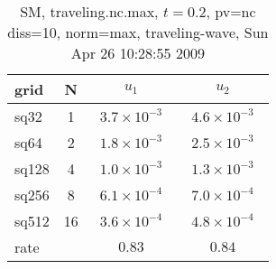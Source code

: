 \begin{table}[hbt]\tableFont %
\begin{center}
\begin{tabular}{|l|c|c|c|} \hline\hline 
grid  & N &  $u_1$ & $u_2$  \\ \hline 
                sq32 &     1 & ~$3.7\times10^{ -3}$~ & ~$4.6\times10^{ -3}$~  \\ \hline
                sq64 &     2 & ~$1.8\times10^{ -3}$~ & ~$2.5\times10^{ -3}$~  \\ \hline
               sq128 &     4 & ~$1.0\times10^{ -3}$~ & ~$1.3\times10^{ -3}$~  \\ \hline
               sq256 &     8 & ~$6.1\times10^{ -4}$~ & ~$7.0\times10^{ -4}$~  \\ \hline
               sq512 &    16 & ~$3.6\times10^{ -4}$~ & ~$4.8\times10^{ -4}$~  \\ \hline
    rate             &       &       $0.83$          &       $0.84$           \\ \hline\hline
\end{tabular}
\caption{SM, traveling.nc.max, $t=0.2$,  pv=nc diss=10, norm=max, traveling-wave, Sun Apr 26 10:28:55 2009}\label{table:traveling.nc.max}
\end{center}
\end{table}
